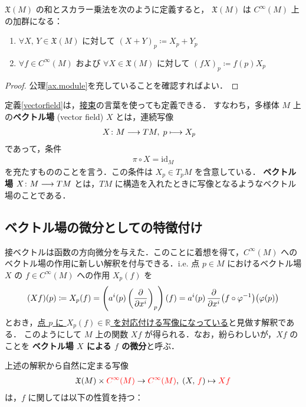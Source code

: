 \documentclass[geometry_main]{subfiles}
\begin{document}
\begin{mydef}[label=def.totvecf]{}
	$\mathfrak{X}(M)$ の和とスカラー乗法を次のように定義すると， $\mathfrak{X}(M)$ は $C^\infty(M)$ 上の加群になる：
	\begin{enumerate}
		\item $\forall X,\, Y \in \mathfrak{X}(M)$ に対して $(X+Y)_p \coloneqq X_p + Y_p$
		\item $\forall f \in C^\infty (M)$ および $\forall X \in \mathfrak{X}(M)$ に対して $(fX)_p \coloneqq f(p) X_p$
	\end{enumerate}
\end{mydef}

\begin{proof}
	公理\ref{ax.module}を充していることを確認すればよい．
\end{proof}

定義\ref{vectorfield}は，\hyperref[def:bundle-tangent]{接束}の言葉を使っても定義できる．
すなわち，\cinfty 多様体 $M$ 上の\textbf{ベクトル場} (vector field) $X$ とは，連続写像
\begin{align}
	X \colon M &\longrightarrow TM,\; p \longmapsto X_p
\end{align}
であって，条件
\begin{align}
	\pi \circ X = \mathrm{id}_M
\end{align}
を充たすもののことを言う．この条件は $X_p \in T_p M$ を含意している．
\cinfty \textbf{ベクトル場} $X\colon M \longrightarrow TM$ とは，$TM$ に\cinfty 構造を入れたときに\cinfty 写像となるようなベクトル場のことである．

\subsection{ベクトル場の微分としての特徴付け}

接ベクトルは函数の方向微分を与えた．このことに着想を得て，$C^\infty (M)$ へのベクトル場の作用に新しい解釈を付与できる．i.e. 点 $p \in M$ におけるベクトル場 $X$ の $f \in C^\infty (M)$ への作用 $X_p(f)$ を
\begin{align}
	(Xf)(p) \coloneqq X_p(f) = \left(a^i(p) \left(\pdv{}{x^i}\right)_p\right)(f) = a^i(p)\, \pdv{}{x^i}\bigl(f \circ \varphi^{-1} \bigr)\bigl(\varphi(p)\bigr)
\end{align}
とおき，\underline{点 $p$ に $X_p(f) \in \mathbb{R}$ を対応付ける写像になっている}と見做す解釈である．
このようにして $M$ 上の\cinfty 関数 $Xf$ が得られる．なお，紛らわしいが，$Xf$ のことを \textbf{ベクトル場 $X$ による $f$ の微分}と呼ぶ．

上述の解釈から自然に定まる写像
\begin{align}
	\mathfrak{X}(M) \times \textcolor{red}{C^\infty (M)} \to \textcolor{red}{C^\infty(M)},\; (X,\, \textcolor{red}{f}) \mapsto \textcolor{red}{Xf}
\end{align}
は，$f$ に関しては以下の性質を持つ：
\end{document}
